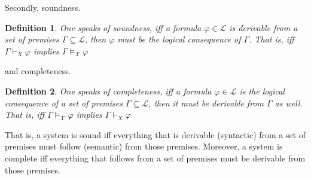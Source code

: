 \documentclass[11pt,a4paper]{article}
\newtheorem{mydef}{Definition}
\begin{document}
Secondly, soundness.
\begin{mydef}
One speaks of soundness, iff a formula $\varphi \in \mathcal{L}$ is derivable from a set of premises $\Gamma \subseteq \mathcal{L}$, then $\varphi$ must be the logical consequence of $\Gamma$. That is, iff   $\Gamma \vdash_X \varphi$ implies $\Gamma \vDash_{\mathcal{X}} \varphi$
\end{mydef}
and completeness.

\begin{mydef}
One speaks of completeness, iff a formula $\varphi \in \mathcal{L}$ is the logical consequence of a set of premises $\Gamma \subseteq \mathcal{L}$, then it must be derivable from $\Gamma$ as well. That is, iff  $\Gamma \vDash_{\mathcal{X}} \varphi$ implies $ \Gamma \vdash_X \varphi$
\end{mydef}
That is, a system is sound iff everything that is derivable (syntactic) from a set of premises must follow (semantic) from those premises. Moreover, a system is complete iff everything that follows from a set of premises must be derivable from those premises. 



\end{document}

